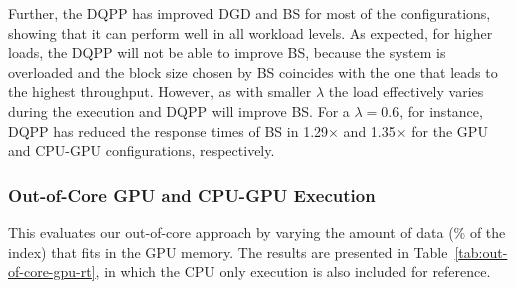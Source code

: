 Further, the DQPP has improved DGD and BS for most of the configurations, showing
that it can perform well in all workload levels. As expected,
for higher loads, the DQPP will not be able to improve BS, because
the system is overloaded and the block size chosen by BS coincides with the one
that leads to the highest throughput. However, as with smaller $\lambda$ the load
effectively varies during the execution and DQPP will improve BS. For a $\lambda=0.6$, for
instance, DQPP has reduced the response times of BS in 1.29$\times$ and 1.35$\times$ 
for the GPU and CPU-GPU configurations, respectively.

\subsubsection{Out-of-Core GPU and CPU-GPU Execution} This evaluates
our out-of-core approach by varying the
amount of data (\% of the index) that fits in the GPU memory. The
results are presented in Table~\ref{tab:out-of-core-gpu-rt}, in which the 
CPU only execution is also included for reference.


